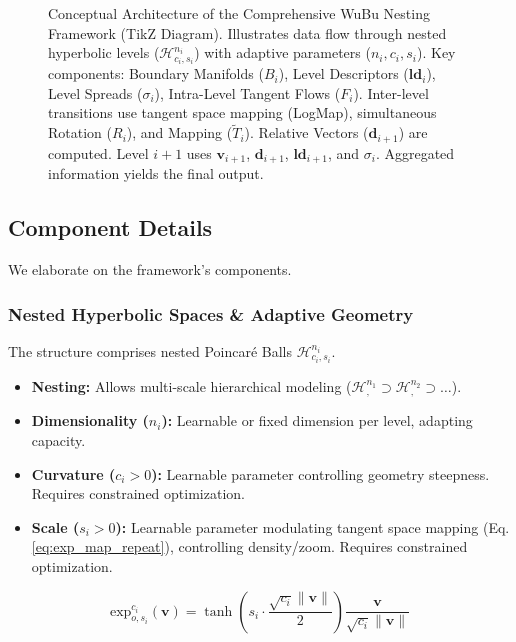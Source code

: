 \documentclass[11pt, twoside]{article} %
\newcommand{\HypSpace}[3]{\mathcal{H}^{#1}_{#2, #3}} %
\begin{document}
\begin{figure}[htbp]
    \caption{Conceptual Architecture of the Comprehensive WuBu Nesting Framework (TikZ Diagram). Illustrates data flow through nested hyperbolic levels ($\HypSpace{n_i}{c_i}{s_i}$) with adaptive parameters ($n_i, c_i, s_i$). Key components: Boundary Manifolds ($B_{i}$), Level Descriptors ($\mathbf{ld}_i$), Level Spreads ($\sigma_i$), Intra-Level Tangent Flows ($F_i$). Inter-level transitions use tangent space mapping (LogMap), simultaneous Rotation ($R_i$), and Mapping ($\tilde{T}_i$). Relative Vectors ($\mathbf{d}_{i+1}$) are computed. Level $i+1$ uses $\mathbf{v}_{i+1}$, $\mathbf{d}_{i+1}$, $\mathbf{ld}_{i+1}$, and $\sigma_i$. Aggregated information yields the final output.}
    \label{fig:architecture_tikz}
\end{figure}


\subsection{Component Details}
\label{subsec:component_details}
We elaborate on the framework's components.

\subsubsection{Nested Hyperbolic Spaces \& Adaptive Geometry}
\label{ssubsec:nested_hyperbolic}
The structure comprises nested Poincaré Balls $\HypSpace{n_i}{c_i}{s_i}$.
\begin{itemize}[leftmargin=*, labelsep=5pt]
    \item \textbf{Nesting:} Allows multi-scale hierarchical modeling ($\HypSpace{n_1}{}{} \supset \HypSpace{n_2}{}{} \supset \dots$).
    \item \textbf{Dimensionality ($n_i$):} Learnable or fixed dimension per level, adapting capacity.
    \item \textbf{Curvature ($c_i > 0$):} Learnable parameter controlling geometry steepness. Requires constrained optimization.
    \item \textbf{Scale ($s_i > 0$):} Learnable parameter modulating tangent space mapping (Eq. \ref{eq:exp_map_repeat}), controlling density/zoom. Requires constrained optimization.
\end{itemize}
\begin{equation}
    \text{exp}_{o,s_i}^{c_i}(\mathbf{v}) = \tanh\left(s_i \cdot \frac{\sqrt{c_i}\|\mathbf{v}\|}{2}\right) \frac{\mathbf{v}}{\sqrt{c_i}\|\mathbf{v}\|}
    \label{eq:exp_map_repeat} %
\end{equation}
\end{document}
